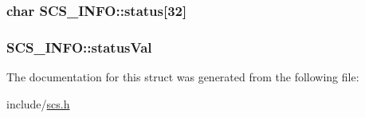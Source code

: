 \hypertarget{struct_s_c_s___i_n_f_o_ac79351c93fe44f38bd52330cabadbc3b}{
\subsubsection[{status}]{\setlength{\rightskip}{0pt plus 5cm}char S\-C\-S\-\_\-\-I\-N\-F\-O\-::status\mbox{[}32\mbox{]}}}\label{struct_s_c_s___i_n_f_o_ac79351c93fe44f38bd52330cabadbc3b}
\hypertarget{struct_s_c_s___i_n_f_o_ae6e5ecc65a6c58d8ae4c8ee2f83af4e1}{
\subsubsection[{status\-Val}]{ S\-C\-S\-\_\-\-I\-N\-F\-O\-::status\-Val}}\label{struct_s_c_s___i_n_f_o_ae6e5ecc65a6c58d8ae4c8ee2f83af4e1}


The documentation for this struct was generated from the following file\-:\begin{DoxyCompactItemize}
\item 
include/\hyperlink{scs_8h}{scs.\-h}\end{DoxyCompactItemize}
